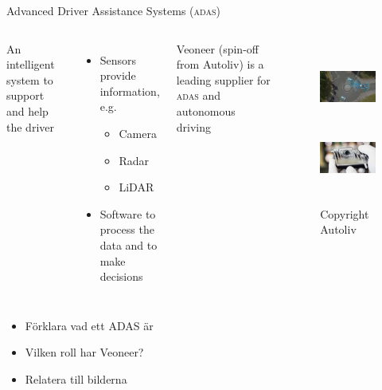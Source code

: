 \documentclass{beamer}
\newcommand{\adas}{\textsc{adas}\xspace}
\newcommand{\eg}{e.g.\xspace}
\renewcommand{\aa}{\"a\xspace}
\renewcommand{\o}{\"o\xspace}
\begin{document}
\begin{frame}{Advanced Driver Assistance Systems (\adas)}
	\begin{columns}
	An intelligent system to support and help the driver
	\begin{itemize}
		\item Sensors provide information, \eg
		\begin{itemize}
			\item Camera
			\item Radar
			\item LiDAR
		\end{itemize}
		\item Software to process the data and to make decisions
	\end{itemize}
	Veoneer (spin-off from Autoliv) is a leading supplier for \adas and autonomous driving
		\begin{figure}
			\includegraphics[height=2.25cm]{fig/ALV_Radar-Detection}
			\includegraphics[height=2.25cm]{fig/ALV_Mono-Vision-Sensor}
			\caption{Copyright Autoliv}
		\end{figure}
	\end{columns}

	\note
	{
		\begin{itemize}
			\item F\o{}rklara vad ett ADAS \aa{}r
			\item Vilken roll har Veoneer?
			\item Relatera till bilderna
		\end{itemize}
	}
\end{frame}
\end{document}
